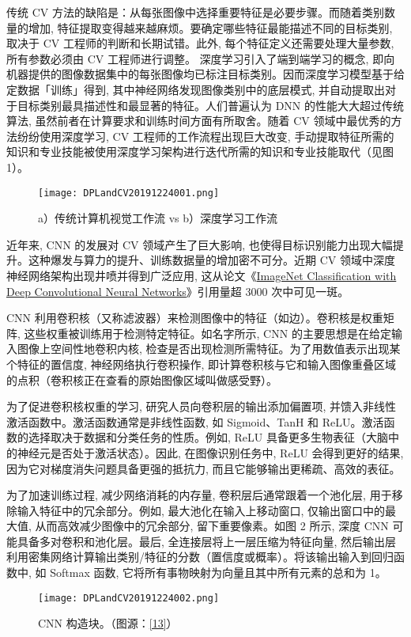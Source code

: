 传统 CV 方法的缺陷是：从每张图像中选择重要特征是必要步骤。而随着类别数量的增加, 特征提取变得越来越麻烦。要确定哪些特征最能描述不同的目标类别, 取决于 CV 工程师的判断和长期试错。此外, 每个特征定义还需要处理大量参数, 所有参数必须由 CV 工程师进行调整。
深度学习引入了端到端学习的概念, 即向机器提供的图像数据集中的每张图像均已标注目标类别。因而深度学习模型基于给定数据「训练」得到, 其中神经网络发现图像类别中的底层模式, 并自动提取出对于目标类别最具描述性和最显著的特征。人们普遍认为 DNN 的性能大大超过传统算法, 虽然前者在计算要求和训练时间方面有所取舍。随着 CV 领域中最优秀的方法纷纷使用深度学习, CV 工程师的工作流程出现巨大改变, 手动提取特征所需的知识和专业技能被使用深度学习架构进行迭代所需的知识和专业技能取代（见图 1）。
\begin{figure}[http]
\centering
\texttt{[image: DPLandCV20191224001.png]}
\caption{a）传统计算机视觉工作流 vs b）深度学习工作流\cite{WANG2018144}}
\label{DPLandCV20191224001}
\end{figure}

近年来, CNN 的发展对 CV 领域产生了巨大影响, 也使得目标识别能力出现大幅提升。这种爆发与算力的提升、训练数据量的增加密不可分。近期 CV 领域中深度神经网络架构出现井喷并得到广泛应用, 这从论文《\href{http://papers.nips.cc/paper/4824-imagenet-classification-with-deep-convolutional-neural-networks}{ImageNet Classification with Deep Convolutional Neural Networks}》引用量超 3000 次中可见一斑。

CNN 利用卷积核（又称滤波器）来检测图像中的特征（如边）。卷积核是权重矩阵, 这些权重被训练用于检测特定特征。如名字所示, CNN 的主要思想是在给定输入图像上空间性地卷积内核, 检查是否出现检测所需特征。为了用数值表示出现某个特征的置信度, 神经网络执行卷积操作, 即计算卷积核与它和输入图像重叠区域的点积（卷积核正在查看的原始图像区域叫做感受野）。

为了促进卷积核权重的学习, 研究人员向卷积层的输出添加偏置项, 并馈入非线性激活函数中。激活函数通常是非线性函数, 如 Sigmoid、TanH 和 ReLU。激活函数的选择取决于数据和分类任务的性质。例如, ReLU 具备更多生物表征（大脑中的神经元是否处于激活状态）。因此, 在图像识别任务中, ReLU 会得到更好的结果, 因为它对梯度消失问题具备更强的抵抗力, 而且它能够输出更稀疏、高效的表征。

为了加速训练过程, 减少网络消耗的内存量, 卷积层后通常跟着一个池化层, 用于移除输入特征中的冗余部分。例如, 最大池化在输入上移动窗口, 仅输出窗口中的最大值, 从而高效减少图像中的冗余部分, 留下重要像素。如图 2 所示, 深度 CNN 可能具备多对卷积和池化层。最后, 全连接层将上一层压缩为特征向量, 然后输出层利用密集网络计算输出类别/特征的分数（置信度或概率）。将该输出输入到回归函数中, 如 Softmax 函数, 它将所有事物映射为向量且其中所有元素的总和为 1。
\begin{figure}[http]
\centering
\texttt{[image: DPLandCV20191224002.png]}
\caption{CNN 构造块。（图源：\href{https://adeshpande3.github.io/adeshpande3.github.io/A-Beginner\%27s-Guide-To-Understanding-Convolutional-Neural-Networks/}{[13]}）}
\label{DPLandCV20191224002}
\end{figure}

